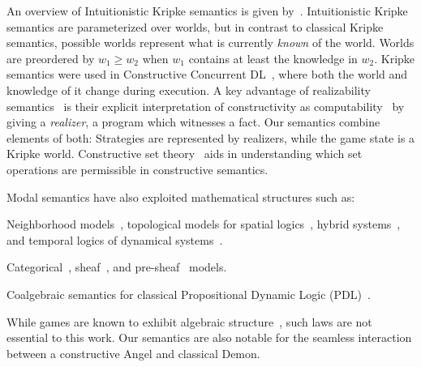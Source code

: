 \documentclass[12pt]{cmuthesis}
\theoremstyle{definition}
\theoremstyle{remark}
\newcommand{\DL}{\textsf{DL}\xspace}
\begin{document}
An overview of Intuitionistic Kripke semantics is given by~\cite{DBLP:journals/apal/Wijesekera90}.
Intuitionistic Kripke semantics are parameterized over worlds, but in contrast to classical Kripke semantics, possible worlds represent what is currently \emph{known} of the world.
Worlds are preordered by $w_1 \geq w_2$ when $w_1$ contains at least the knowledge in $w_2$.
Kripke semantics were used in Constructive Concurrent \DL~\cite{DBLP:journals/apal/WijesekeraN05}, where both the world and knowledge of it change during execution.
A key advantage of realizability semantics~\cite{DBLP:journals/mscs/Oosten02,lipton1992constructive} is their explicit interpretation of constructivity as computability~\cite{DBLP:conf/cca/Bauer05} by giving a \emph{realizer}, a program which witnesses a fact.
Our semantics combine elements of both: Strategies are represented by realizers, while the game state is a Kripke world.
Constructive set theory~\cite{DBLP:journals/jsyml/AczelG06} aids in understanding which set operations are permissible in constructive semantics.

Modal semantics have also exploited mathematical structures such as:
\begin{inparaenum}[i)]
\item Neighborhood models~\cite{DBLP:conf/lori/BenthemBE17}, topological models for spatial logics~\cite{DBLP:reference/spatial/BenthemB07}, hybrid systems~\cite{DBLP:conf/lfcs/ArtemovDN97}, and temporal logics of dynamical systems~\cite{DBLP:journals/lmcs/Fernandez-Duque18}.
\item Categorical~\cite{DBLP:conf/csl/AlechinaMPR01}, sheaf~\cite{Hilken_afirst}, and pre-sheaf~\cite{DBLP:journals/aml/Ghilardi89} models.
\item Coalgebraic semantics for classical Propositional Dynamic Logic (PDL)~\cite{DBLP:journals/corr/abs-1109-3685}.
\end{inparaenum}
While games are known to exhibit algebraic structure~\cite{DBLP:journals/sLogica/Goranko03}, such laws are not essential to this work.
Our semantics are also notable for the seamless interaction between a constructive Angel and classical Demon.
\end{document}
